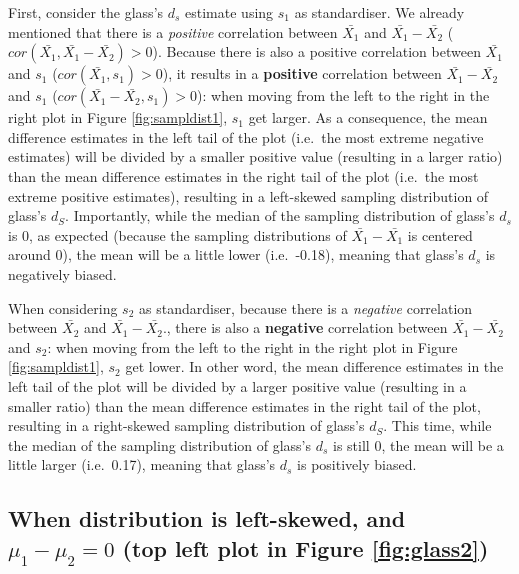 \documentclass[
  man,floatsintext]{apa6}
\begin{document}
First, consider the glass's \(d_s\) estimate using \(s_1\) as standardiser. We already mentioned that there is a \emph{positive} correlation between \(\bar{X_1}\) and \(\bar{X_1}-\bar{X_2}\) (\(cor(\bar{X_1},\bar{X_1}-\bar{X_2})>0\)). Because there is also a positive correlation between \(\bar{X_1}\) and \(s_1\) (\(cor(\bar{X_1},s_1)>0\)), it results in a \textbf{positive} correlation between \(\bar{X_1}-\bar{X_2}\) and \(s_1\) (\(cor(\bar{X_1}-\bar{X_2},s_1)>0\)): when moving from the left to the right in the right plot in Figure \ref{fig:sampldist1}, \(s_1\) get larger. As a consequence, the mean difference estimates in the left tail of the plot (i.e.~the most extreme negative estimates) will be divided by a smaller positive value (resulting in a larger ratio) than the mean difference estimates in the right tail of the plot (i.e.~the most extreme positive estimates), resulting in a left-skewed sampling distribution of glass's \(d_S\). Importantly, while the median of the sampling distribution of glass's \(d_s\) is 0, as expected (because the sampling distributions of \(\bar{X_1}-\bar{X_1}\) is centered around 0), the mean will be a little lower (i.e.~-0.18), meaning that glass's \(d_s\) is negatively biased.

When considering \(s_2\) as standardiser, because there is a \emph{negative} correlation between \(\bar{X_2}\) and \(\bar{X_1}-\bar{X_2}\)., there is also a \textbf{negative} correlation between \(\bar{X_1}-\bar{X_2}\) and \(s_2\): when moving from the left to the right in the right plot in Figure \ref{fig:sampldist1}, \(s_2\) get lower. In other word, the mean difference estimates in the left tail of the plot will be divided by a larger positive value (resulting in a smaller ratio) than the mean difference estimates in the right tail of the plot, resulting in a right-skewed sampling distribution of glass's \(d_S\). This time, while the median of the sampling distribution of glass's \(d_s\) is still 0, the mean will be a little larger (i.e.~0.17), meaning that glass's \(d_s\) is positively biased.

\hypertarget{when-distribution-is-left-skewed-and-mu_1-mu_20-top-left-plot-in-figure}{%
\subsection{\texorpdfstring{When distribution is left-skewed, and \textbf{\(\mu_1-\mu_2=0\)} (top left plot in Figure \ref{fig:glass2})}{When distribution is left-skewed, and \textbackslash mu\_1-\textbackslash mu\_2=0 (top left plot in Figure )}}\label{when-distribution-is-left-skewed-and-mu_1-mu_20-top-left-plot-in-figure}}
\end{document}
